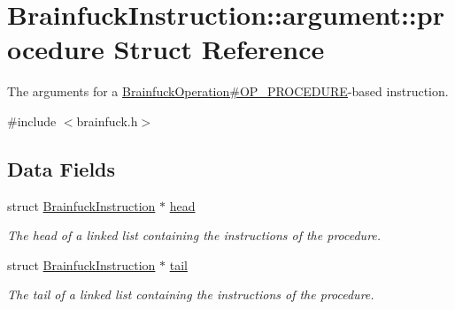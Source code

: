 \hypertarget{structBrainfuckInstruction_1_1argument_1_1procedure}{}\section{Brainfuck\+Instruction\+:\+:argument\+:\+:procedure Struct Reference}
\label{structBrainfuckInstruction_1_1argument_1_1procedure}


The arguments for a \hyperlink{group__ast_ggac30413d006b783ec42faef68b2aa6c12a509f8710cbb162ea87eb762a04fa7d05}{Brainfuck\+Operation\#\+O\+P\+\_\+\+P\+R\+O\+C\+E\+D\+U\+R\+E}-\/based instruction.  




{\ttfamily \#include $<$brainfuck.\+h$>$}

\subsection*{Data Fields}
\begin{DoxyCompactItemize}
\item 
\hypertarget{structBrainfuckInstruction_1_1argument_1_1procedure_acee9c82af89248fce3fa87e0d03eff3f}{}struct \hyperlink{structBrainfuckInstruction}{Brainfuck\+Instruction} $\ast$ \hyperlink{structBrainfuckInstruction_1_1argument_1_1procedure_acee9c82af89248fce3fa87e0d03eff3f}{head}\label{structBrainfuckInstruction_1_1argument_1_1procedure_acee9c82af89248fce3fa87e0d03eff3f}

\begin{DoxyCompactList}\small\item\em The head of a linked list containing the instructions of the procedure. \end{DoxyCompactList}\item 
\hypertarget{structBrainfuckInstruction_1_1argument_1_1procedure_aedcf6ea4ee062685d22f60df808ea89b}{}struct \hyperlink{structBrainfuckInstruction}{Brainfuck\+Instruction} $\ast$ \hyperlink{structBrainfuckInstruction_1_1argument_1_1procedure_aedcf6ea4ee062685d22f60df808ea89b}{tail}\label{structBrainfuckInstruction_1_1argument_1_1procedure_aedcf6ea4ee062685d22f60df808ea89b}

\begin{DoxyCompactList}\small\item\em The tail of a linked list containing the instructions of the procedure. \end{DoxyCompactList}\end{DoxyCompactItemize}


